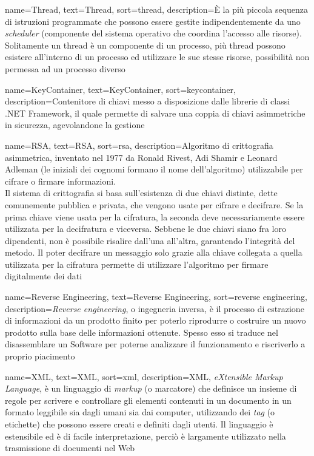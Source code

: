 {
	name={Thread},
	text={Thread},
	sort={thread},
	description={È la più piccola sequenza di istruzioni programmate che possono essere gestite indipendentemente da uno \textit{scheduler} (componente del sistema operativo che coordina l'accesso alle risorse). Solitamente un thread è un componente di un processo, più thread possono esistere all'interno di un processo ed utilizzare le sue stesse risorse, possibilità non permessa ad un processo diverso}
}

{
	name={KeyContainer},
	text={KeyContainer},
	sort=keycontainer,
	description={Contenitore di chiavi messo a disposizione dalle librerie di classi .NET Framework, il quale permette di salvare una coppia di chiavi asimmetriche in sicurezza, agevolandone la gestione}
}

{
	name={RSA},
	text={RSA},
	sort={rsa},
	description={Algoritmo di crittografia asimmetrica, inventato nel 1977 da Ronald Rivest, Adi Shamir e Leonard Adleman (le iniziali dei cognomi formano il nome dell'algoritmo) utilizzabile per cifrare o firmare informazioni.\\
Il sistema di crittografia si basa sull'esistenza di due chiavi distinte, dette comunemente pubblica e privata, che vengono usate per cifrare e decifrare. Se la prima chiave viene usata per la cifratura, la seconda deve necessariamente essere utilizzata per la decifratura e viceversa. Sebbene le due chiavi siano fra loro dipendenti, non è possibile risalire dall'una all'altra, garantendo l'integrità del metodo. Il poter decifrare un messaggio solo grazie alla chiave collegata a quella utilizzata per la cifratura permette di utilizzare l'algoritmo per firmare digitalmente dei dati}
}

{
	name={Reverse Engineering},
	text={Reverse Engineering},
	sort={reverse engineering},
	description={\textit{Reverse engineering}, o ingegneria inversa, è il processo di estrazione di informazioni da un prodotto finito per poterlo riprodurre o costruire un nuovo prodotto sulla base delle informazioni ottenute. Spesso esso si traduce nel disassemblare un Software per poterne analizzare il funzionamento e riscriverlo a proprio piacimento}
}

{
	name={XML},
	text={XML},
	sort={xml},
	description={XML, \textit{eXtensible Markup Language}, è un linguaggio di \textit{markup} (o marcatore) che definisce un insieme di regole per scrivere e controllare gli elementi contenuti in un documento in un formato leggibile sia dagli umani sia dai computer, utilizzando dei \textit{tag} (o etichette) che possono essere creati e definiti dagli utenti. Il linguaggio è estensibile ed è di facile interpretazione, perciò è largamente utilizzato nella trasmissione di documenti nel Web}
}

